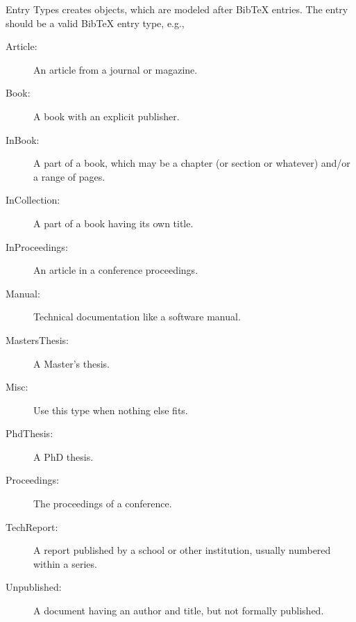 \begin{Section}{Entry Types}
 creates  objects, which are modeled
after BibTeX entries.  The entry should be a valid BibTeX entry type,
e.g.,
\begin{description}

\item[Article:] An article from a journal or magazine.
\item[Book:] A book with an explicit publisher.
\item[InBook:] A part of a book, which may be a chapter (or section
or whatever) and/or a range of pages. 
\item[InCollection:] A part of a book having its own title.
\item[InProceedings:] An article in a conference proceedings.
\item[Manual:] Technical documentation like a software manual.
\item[MastersThesis:] A Master's thesis.
\item[Misc:] Use this type when nothing else fits.
\item[PhdThesis:] A PhD thesis.
\item[Proceedings:] The proceedings of a conference.
\item[TechReport:] A report published by a school or other
institution, usually numbered within a series.
\item[Unpublished:] A document having an author and title, but not
formally published.

\end{description}

\end{Section}
%
